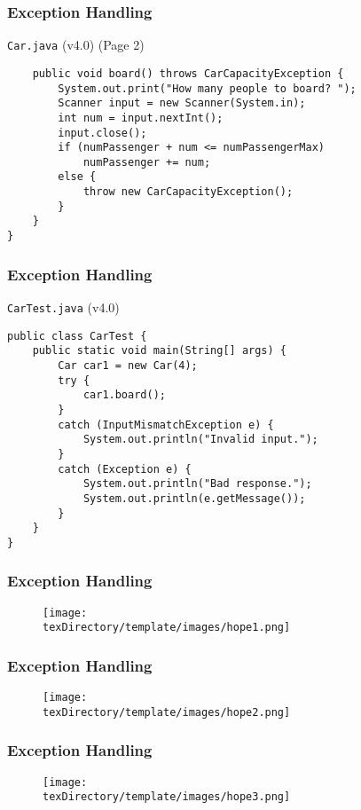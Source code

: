 \documentclass[10pt, compress]{beamer}
\begin{document}
\begin{frame}[fragile]
	\frametitle{Exception Handling}
	\begin{block}{\texttt{Car.java} (v4.0) (Page 2)}
		\begin{verbatim}
	public void board() throws CarCapacityException {
		System.out.print("How many people to board? ");
		Scanner input = new Scanner(System.in);
		int num = input.nextInt();
		input.close();
		if (numPassenger + num <= numPassengerMax)
			numPassenger += num;
		else {
			throw new CarCapacityException();
		}
	}
}
		\end{verbatim}
	\end{block}
\end{frame}

\begin{frame}[fragile]
	\frametitle{Exception Handling}
	\begin{block}{\texttt{CarTest.java} (v4.0)}
		\begin{verbatim}
public class CarTest {
	public static void main(String[] args) {
		Car car1 = new Car(4);
		try {
			car1.board();
		}
		catch (InputMismatchException e) {
			System.out.println("Invalid input.");
		}
		catch (Exception e) {
			System.out.println("Bad response.");
			System.out.println(e.getMessage());
		}
	}
}
		\end{verbatim}
	\end{block}
\end{frame}

\begin{frame}[fragile]
	\frametitle{Exception Handling}
	\begin{figure}
		\texttt{[image: \\texDirectory/template/images/hope1.png]}
	\end{figure}
\end{frame}

\begin{frame}[fragile]
	\frametitle{Exception Handling}
	\begin{figure}
		\texttt{[image: \\texDirectory/template/images/hope2.png]}
	\end{figure}
\end{frame}

\begin{frame}[fragile]
	\frametitle{Exception Handling}
	\begin{figure}
		\texttt{[image: \\texDirectory/template/images/hope3.png]}
	\end{figure}
\end{frame}

\end{document}
